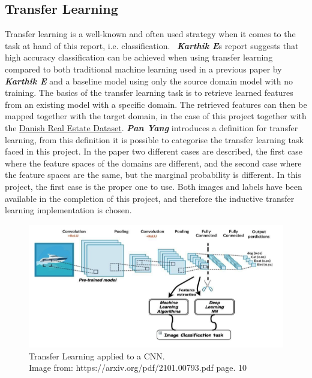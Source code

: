 \subsection{Transfer Learning}\label{sec:Transfer}
\par
Transfer learning is a well-known and often used strategy when it comes to the task at hand of this report, i.e. classification.  \textbf{\textit{Karthik E}}\autocite{e2021framework}s report suggests that high accuracy classification can be achieved when using transfer learning compared to both traditional machine learning used in a previous paper by \textbf{\textit{Karthik E}} and a baseline model using only the source domain model with no training. The basics of the transfer learning task is to retrieve learned features from an existing model with a specific domain. The retrieved features can then be mapped together with the target domain, in the case of this project together with the \hyperref[sec:DRE19]{Danish Real Estate Dataset}. \textbf{\textit{Pan Yang}} \autocite{PanYang2010} introduces a definition for transfer learning, from this definition it is possible to categorise the transfer learning task faced in this project. In the paper two different cases are described, the first case where the feature spaces of the domains are different, and the second case where the feature spaces are the same, but the marginal probability is different. In this project, the first case is the proper one to use. Both images and labels have been available in the completion of this project, and therefore the inductive transfer learning implementation is chosen.
\begin{figure}[H]
    \centering
    \includegraphics[width =\textwidth]{pictures/random/Transferlearning}
    \caption{Transfer Learning applied to a CNN.\\
    Image from: https://arxiv.org/pdf/2101.00793.pdf page. 10}
    \label{ref:TransferLearning}
\end{figure}
